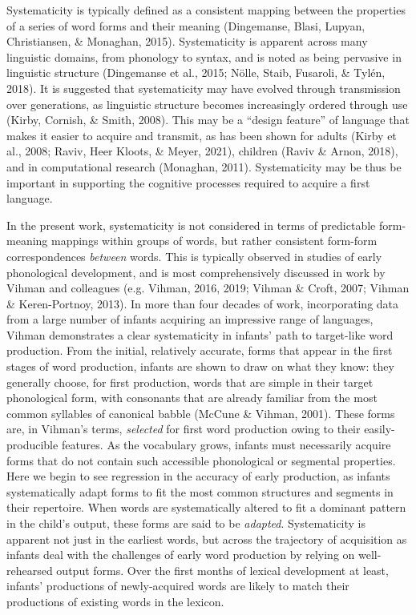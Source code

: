 \documentclass[
  man]{apa6}
\begin{document}
Systematicity is typically defined as a consistent mapping between the properties of a series of word forms and their meaning (Dingemanse, Blasi, Lupyan, Christiansen, \& Monaghan, 2015). Systematicity is apparent across many linguistic domains, from phonology to syntax, and is noted as being pervasive in linguistic structure (Dingemanse et al., 2015; Nölle, Staib, Fusaroli, \& Tylén, 2018). It is suggested that systematicity may have evolved through transmission over generations, as linguistic structure becomes increasingly ordered through use (Kirby, Cornish, \& Smith, 2008). This may be a ``design feature'' of language that makes it easier to acquire and transmit, as has been shown for adults (Kirby et al., 2008; Raviv, Heer Kloots, \& Meyer, 2021), children (Raviv \& Arnon, 2018), and in computational research (Monaghan, 2011). Systematicity may be thus be important in supporting the cognitive processes required to acquire a first language.

In the present work, systematicity is not considered in terms of predictable form-meaning mappings within groups of words, but rather consistent form-form correspondences \emph{between} words. This is typically observed in studies of early phonological development, and is most comprehensively discussed in work by Vihman and colleagues (e.g. Vihman, 2016, 2019; Vihman \& Croft, 2007; Vihman \& Keren-Portnoy, 2013). In more than four decades of work, incorporating data from a large number of infants acquiring an impressive range of languages, Vihman demonstrates a clear systematicity in infants' path to target-like word production. From the initial, relatively accurate, forms that appear in the first stages of word production, infants are shown to draw on what they know: they generally choose, for first production, words that are simple in their target phonological form, with consonants that are already familiar from the most common syllables of canonical babble (McCune \& Vihman, 2001). These forms are, in Vihman's terms, \emph{selected} for first word production owing to their easily-producible features. As the vocabulary grows, infants must necessarily acquire forms that do not contain such accessible phonological or segmental properties. Here we begin to see regression in the accuracy of early production, as infants systematically adapt forms to fit the most common structures and segments in their repertoire. When words are systematically altered to fit a dominant pattern in the child's output, these forms are said to be \emph{adapted}. Systematicity is apparent not just in the earliest words, but across the trajectory of acquisition as infants deal with the challenges of early word production by relying on well-rehearsed output forms. Over the first months of lexical development at least, infants' productions of newly-acquired words are likely to match their productions of existing words in the lexicon.
\end{document}
